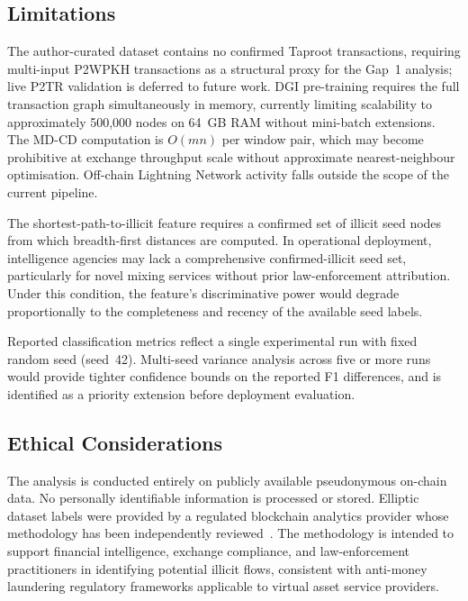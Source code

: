 \documentclass[12pt,a4paper]{article}
\begin{document}
\subsection{Limitations}

The author-curated dataset contains no confirmed Taproot
transactions, requiring multi-input P2WPKH transactions as a
structural proxy for the Gap~1 analysis; live P2TR validation
is deferred to future work. DGI pre-training requires the
full transaction graph simultaneously in memory, currently
limiting scalability to approximately 500,000 nodes on 64~GB
RAM without mini-batch extensions. The MD-CD computation is
$O(mn)$ per window pair, which may become prohibitive at
exchange throughput scale without approximate nearest-neighbour
optimisation. Off-chain Lightning Network activity falls
outside the scope of the current pipeline.

The shortest-path-to-illicit feature requires a confirmed
set of illicit seed nodes from which breadth-first distances
are computed. In operational deployment, intelligence agencies
may lack a comprehensive confirmed-illicit seed set,
particularly for novel mixing services without prior
law-enforcement attribution. Under this condition, the
feature's discriminative power would degrade proportionally
to the completeness and recency of the available seed labels.

Reported classification metrics reflect a single experimental
run with fixed random seed (seed~42). Multi-seed variance
analysis across five or more runs would provide tighter
confidence bounds on the reported F1 differences, and is
identified as a priority extension before deployment
evaluation.

\subsection{Ethical Considerations}

The analysis is conducted entirely on publicly available
pseudonymous on-chain data. No personally identifiable
information is processed or stored. Elliptic dataset labels
were provided by a regulated blockchain analytics provider
whose methodology has been independently reviewed~\citep{weber2019}.
The methodology is intended to support financial intelligence,
exchange compliance, and law-enforcement practitioners in
identifying potential illicit flows, consistent with
anti-money laundering regulatory frameworks applicable to
virtual asset service providers.

\end{document}
